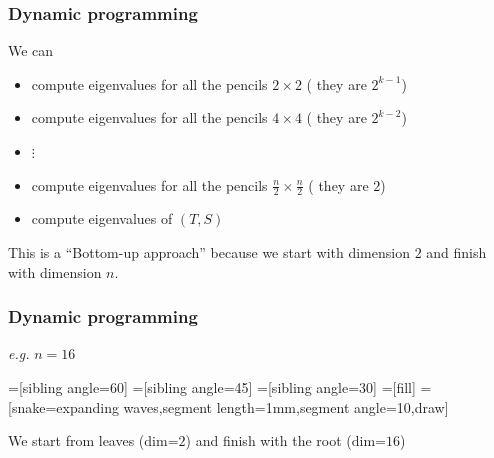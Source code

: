\documentclass{beamer}
\newcommand{\C}{\mathbb{C}}
\theoremstyle{definition} \newtheorem{de}{Def}
\theoremstyle{remark} \newtheorem{os}[de]{Remark}
\theoremstyle{plain} \newtheorem{te}[de]{Teo}
\theoremstyle{plain} \newtheorem{co}[de]{Cor}
\theoremstyle{plain} \newtheorem{pr}[de]{Prop}
\theoremstyle{plain} \newtheorem{lem}[de]{Lemm}
\theoremstyle{remark} \newtheorem{rem}[de]{Remark}
\begin{document}
\begin{frame}
  \frametitle{Dynamic programming}

  We can 

  \begin{itemize}

    \item compute eigenvalues for all the pencils $2\times 2$ ( they are $2^{k-1}$)
    \item compute eigenvalues for all the pencils $4\times 4$ ( they are $2^{k-2}$)
    \item $\vdots$
    \item compute eigenvalues for all the pencils $\frac{n}{2}\times \frac{n}{2}$ ( they are $2$)
    \item compute eigenvalues of $(T,S)$

  \end{itemize}

  \pause

  This is a ``Bottom-up approach'' because we start with dimension $2$ and finish with dimension $n$.

\end{frame}

\begin{frame}

  \frametitle{Dynamic programming}
  
  \emph{e.g.} $n=16$ 

  =[sibling angle=60]
  =[sibling angle=45]
  =[sibling angle=30]
  =[fill]
  =[snake=expanding waves,segment length=1mm,segment angle=10,draw]
  
  We start from leaves ($\text{dim=}2$) and finish with the root ($\text{dim=}16$)

\end{frame}
\end{document}
